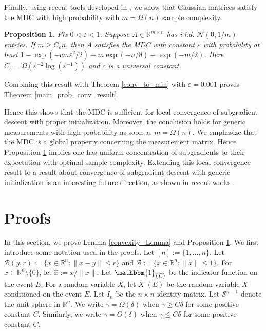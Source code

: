 \documentclass[11pt]{article}
\newcommand{\R}{\mathbb{R}}
\newcommand{\one}{\operatorname{\mathbbm{1}}}
\renewcommand{\epsilon}{\varepsilon}
\newcommand{\Bcal}{\mathcal{B}}
\newtheorem{proposition}{Proposition}
\begin{document}
Finally, using recent tools developed in \cite{Daskalaskisetal2020}, we show that Gaussian matrices satisfy the MDC with high probability with $m = \Omega(n)$ sample complexity.

\begin{proposition} \label{MDC_prop} Fix $0 < \epsilon < 1$.
Suppose $A \in \R^{m \times n}$ has i.i.d. $\mathcal{N}(0,1/m)$ entries. If $m \geqslant C_{\epsilon} n$, then $A$ satisfies the MDC with constant $\epsilon$ with probability at least $1 - \exp(-cm\epsilon^2/2)- m\exp(-n/8) - \exp(-m/2)$. Here $C_{\epsilon} = \Omega(\epsilon^{-2}\log(\epsilon^{-1}))$ and $c$ is a universal constant.
\end{proposition}

\noindent Combining this result with Theorem \ref{conv_to_min} with $ \epsilon = 0.001$ proves Theorem \ref{main_prob_conv_result}.

Hence this shows that the MDC is sufficient for local convergence of subgradient descent with proper initialization. Moreover, the conclusion holds for generic measurements with high probability as soon as $m = \Omega(n)$. We emphasize that the MDC is a global property concerning the measurement matrix. Hence Proposition \ref{MDC_prop} implies one has uniform concentration of subgradients to their expectation with optimal sample complexity. Extending this local convergence result to a result about convergence of subgradient descent with generic initialization is an interesting future direction, as shown in recent works \cite{Chenetal19, TanVershynin19}. 

\section{Proofs} \label{proofs_section}


In this section, we prove Lemma \ref{convexity_Lemma} and Proposition \ref{MDC_prop}. We first introduce some notation used in the proofs. Let $[n] := \{1,\dots,n\}$. Let $\mathcal{B}(y,r) :=\{x \in \R^n : \|x-y\|\leqslant r\}$ and $\Bcal:=\{x \in \R^n : \|x\|\leqslant 1\}$. For $x \in \R^n \setminus\{0\}$, let $\hat{x} := x/\|x\|$. Let $\one_{\{E\}}$ be the indicator function on the event $E$. For a random variable $X$, let $X|(E)$ be the random variable $X$ conditioned on the event $E$. Let $I_n$ be the $n \times n$ identity matrix. Let $\mathcal{S}^{n-1}$ denote the unit sphere in $\R^n$. We write $\gamma = \Omega(\delta)$ when $\gamma \geqslant C\delta$ for some positive constant $C$. Similarly, we write $\gamma = O(\delta)$ when $\gamma \leqslant C \delta$ for some positive constant $C$. 
\end{document}
